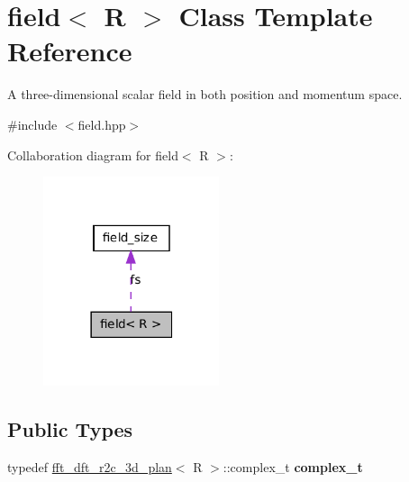 \hypertarget{classfield}{
\section{field$<$ R $>$ Class Template Reference}
\label{classfield}
}


A three-\/dimensional scalar field in both position and momentum space.  




{\ttfamily \#include $<$field.hpp$>$}



Collaboration diagram for field$<$ R $>$:
\nopagebreak
\begin{figure}[H]
\begin{center}
\leavevmode
\includegraphics[width=146pt]{classfield__coll__graph}
\end{center}
\end{figure}
\subsection*{Public Types}
\begin{DoxyCompactItemize}
\item 
\hypertarget{classfield_a4783d2c59b62ef73a4c3f4f7ca0b2fb7}{
typedef \hyperlink{classfft__dft__r2c__3d__plan}{fft\_\-dft\_\-r2c\_\-3d\_\-plan}$<$ R $>$::complex\_\-t {\bfseries complex\_\-t}}
\label{classfield_a4783d2c59b62ef73a4c3f4f7ca0b2fb7}

\end{DoxyCompactItemize}
